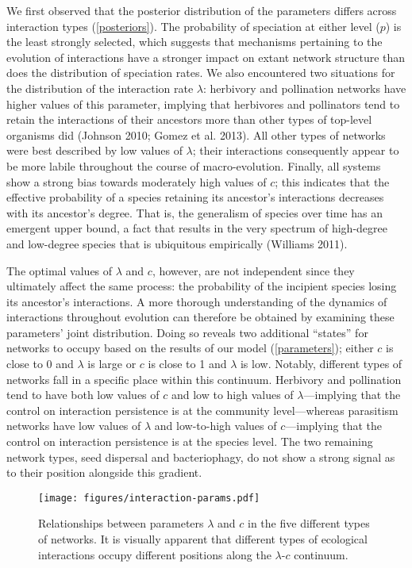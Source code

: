 \documentclass[12pt]{article}
\begin{document}
We first observed that the posterior distribution of the parameters
differs across interaction types (\autoref{posteriors}). The probability
of speciation at either level (\(p\)) is the least strongly selected,
which suggests that mechanisms pertaining to the evolution of
interactions have a stronger impact on extant network structure than
does the distribution of speciation rates. We also encountered two
situations for the distribution of the interaction rate \(\lambda\):
herbivory and pollination networks have higher values of this parameter,
implying that herbivores and pollinators tend to retain the interactions
of their ancestors more than other types of top-level organisms did
(Johnson 2010; Gomez et al. 2013). All other types of networks were best
described by low values of \(\lambda\); their interactions consequently
appear to be more labile throughout the course of macro-evolution.
Finally, all systems show a strong bias towards moderately high values
of \(c\); this indicates that the effective probability of a species
retaining its ancestor's interactions decreases with its ancestor's
degree. That is, the generalism of species over time has an emergent
upper bound, a fact that results in the very spectrum of high-degree and
low-degree species that is ubiquitous empirically (Williams 2011).

The optimal values of \(\lambda\) and \(c\), however, are not
independent since they ultimately affect the same process: the
probability of the incipient species losing its ancestor's interactions.
A more thorough understanding of the dynamics of interactions throughout
evolution can therefore be obtained by examining these parameters' joint
distribution. Doing so reveals two additional ``states'' for networks to
occupy based on the results of our model (\autoref{parameters}); either
\(c\) is close to 0 and \(\lambda\) is large or \(c\) is close to 1 and
\(\lambda\) is low. Notably, different types of networks fall in a
specific place within this continuum. Herbivory and pollination tend to
have both low values of \(c\) and low to high values of
\(\lambda\)---implying that the control on interaction persistence is at
the community level---whereas parasitism networks have low values of
\(\lambda\) and low-to-high values of \(c\)---implying that the control
on interaction persistence is at the species level. The two remaining
network types, seed dispersal and bacteriophagy, do not show a strong
signal as to their position alongside this gradient.

\begin{figure*}[bt]
    \centering
    \texttt{[image: figures/interaction-params.pdf]}
    \caption[Relationships between parameters $\lambda$ and $c$.]{Relationships between parameters $\lambda$ and $c$ in the five different types of networks. It is visually apparent that different types of ecological interactions occupy different positions along the $\lambda$-$c$ continuum.}
    \label{parameters}
\end{figure*}
\end{document}
